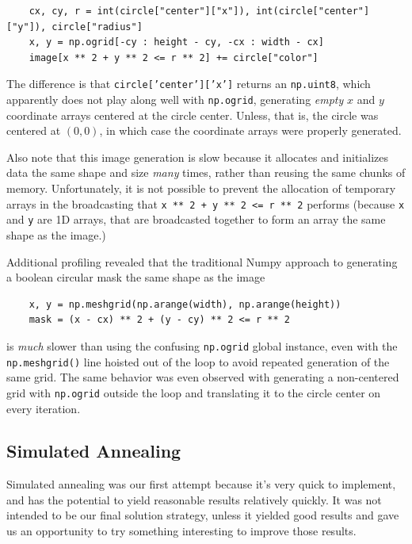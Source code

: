 \documentclass{article}
\begin{document}
\begin{verbatim}
    cx, cy, r = int(circle["center"]["x"]), int(circle["center"]["y"]), circle["radius"]
    x, y = np.ogrid[-cy : height - cy, -cx : width - cx]
    image[x ** 2 + y ** 2 <= r ** 2] += circle["color"]
\end{verbatim}

The difference is that \texttt{circle['center']['x']} returns an
\texttt{np.uint8}, which apparently does not play along well with
\texttt{np.ogrid}, generating \textit{empty} $x$ and $y$ coordinate arrays centered at
the circle center. Unless, that is, the circle was centered at $(0, 0)$, in which case the
coordinate arrays were properly generated.

Also note that this image generation is slow because it allocates and initializes data the same
shape and size \textit{many} times, rather than reusing the same chunks of memory. Unfortunately,
it is not possible to prevent the allocation of temporary arrays in the broadcasting that
\texttt{x ** 2 + y ** 2 <= r ** 2} performs (because \texttt{x} and
\texttt{y} are 1D arrays, that are broadcasted together to form an array the same shape
as the image.)

Additional profiling revealed that the traditional Numpy approach to generating a boolean circular
mask the same shape as the image

\begin{verbatim}
    x, y = np.meshgrid(np.arange(width), np.arange(height))
    mask = (x - cx) ** 2 + (y - cy) ** 2 <= r ** 2
\end{verbatim}

is \textit{much} slower than using the confusing \texttt{np.ogrid} global instance,
even with the \texttt{np.meshgrid()} line hoisted out of the loop to avoid repeated
generation of the same grid. The same behavior was even observed with generating a non-centered
grid with \texttt{np.ogrid} outside the loop and translating it to the circle center on
every iteration.

\subsection{Simulated Annealing}\label{sec:strat:simulated-annealing}

Simulated annealing was our first attempt because it's very quick to implement, and has the
potential to yield reasonable results relatively quickly. It was not intended to be our final
solution strategy, unless it yielded good results and gave us an opportunity to try something
interesting to improve those results.
\end{document}
